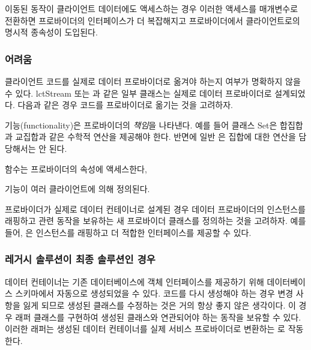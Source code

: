 \documentclass[a4paper,10pt,twoside]{book}
\begin{document}
\begin{bulletlist}
\item 이동된 동작이 클라이언트 데이터에도 액세스하는 경우 이러한 액세스를 매개변수로 전환하면 프로바이더의 인터페이스가 더 복잡해지고 프로바이더에서 클라이언트로의 명시적 종속성이 도입된다.
\end{bulletlist}

\subsubsection*{어려움}

\begin{bulletlist}
\item 클라이언트 코드를 실제로 데이터 프로바이더로 옮겨야 하는지 여부가 명확하지 않을 수 있다. lct{Stream} 또는 과 같은 일부 클래스는 실제로 데이터 프로바이더로 설계되었다. 다음과 같은 경우 코드를 프로바이더로 옮기는 것을 고려하자.

\begin{bulletlist}
\item 기능(functionality)은 프로바이더의 \emph{책임}을 나타낸다. 예를 들어 클래스 Set은 합집합과 교집합과 같은 수학적 연산을 제공해야 한다. 반면에 일반 은  집합에 대한 연산을 담당해서는 안 된다.
\item 함수는 프로바이더의 속성에 액세스한다,
\item 기능이 여러 클라이언트에 의해 정의된다.
\end{bulletlist}

\item 프로바이더가 실제로 데이터 컨테이너로 설계된 경우 데이터 프로바이더의 인스턴스를 래핑하고 관련 동작을 보유하는 새 프로바이더 클래스를 정의하는 것을 고려하자. 예를 들어, 은  인스턴스를 래핑하고 더 적합한 인터페이스를 제공할 수 있다.
\end{bulletlist}

\subsubsection*{레거시 솔루션이 최종 솔루션인 경우}

데이터 컨테이너는 기존 데이터베이스에 객체 인터페이스를 제공하기 위해 데이터베이스 스키마에서 자동으로 생성되었을 수 있다. 코드를 다시 생성해야 하는 경우 변경 사항을 잃게 되므로 생성된 클래스를 수정하는 것은 거의 항상 좋지 않은 생각이다. 이 경우 래퍼 클래스를 구현하여 생성된 클래스와 연관되어야 하는 동작을 보유할 수 있다. 이러한 래퍼는 생성된 데이터 컨테이너를 실제 서비스 프로바이더로 변환하는 로 작동한다. 
\end{document}
